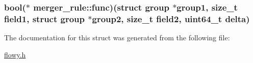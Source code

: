 \hypertarget{structmerger__rule_ac607a34fb5aec5b1ac28961b4148c0e0}{
\subsubsection[{func}]{\setlength{\rightskip}{0pt plus 5cm}bool($\ast$ {\bf merger\-\_\-rule\-::func})(struct {\bf group} $\ast$group1, size\-\_\-t {\bf field1}, struct {\bf group} $\ast$group2, size\-\_\-t {\bf field2}, uint64\-\_\-t {\bf delta})}}\label{structmerger__rule_ac607a34fb5aec5b1ac28961b4148c0e0}


\-The documentation for this struct was generated from the following file\-:\begin{DoxyCompactItemize}
\item 
\hyperlink{flowy_8h}{flowy.\-h}\end{DoxyCompactItemize}
